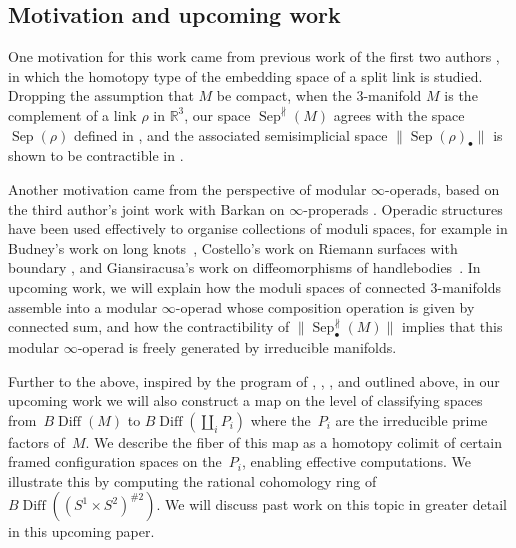 \documentclass{amsart}
\theoremstyle{plain}
\theoremstyle{definition}
\DeclareMathOperator\Diff{Diff}
\DeclareMathOperator\sep{Sep} %
\newcommand{\sepNP}{\sep^{\nparallel}} %
\newcommand{\BDiff}{B\!\Diff}
\newcommand{\bt}{\bullet}
\begin{document}
\subsection{Motivation and upcoming work}\label{subsection - upcoming work}

One motivation for this work came from previous work of the first two authors \cite{BoydBregman22}, in which the homotopy type of the embedding space of a split link is studied. Dropping the assumption that $M$ be compact, when the 3-manifold $M$ is the complement of a link $\rho$ in $\mathbb{R}^3$, our space $\sepNP(M)$ agrees with the space $\sep(\rho)$ defined in \cite{BoydBregman22}, and the associated semisimplicial space $\|\sep(\rho)_\bullet\|$ is shown to be contractible in \cite[Theorem A]{BoydBregman22}. 

Another motivation came from the perspective of modular $\infty$-operads, based on the third author's joint work with Barkan on $\infty$-properads \cite{equifibered-properads}.
Operadic structures have been used effectively to organise collections of moduli spaces, for example in Budney's work on long knots~\cite{Budney}, Costello's work on Riemann surfaces with boundary \cite{costello2004ainfinity}, and Giansiracusa's work on diffeomorphisms of handlebodies~\cite{Giansiracusa11}.
In upcoming work, we will explain how the moduli spaces of connected $3$-manifolds assemble into a modular $\infty$-operad whose composition operation is given by connected sum, 
and how the contractibility of $\|\sepNP_\bt(M)\|$ implies that this modular $\infty$-operad is freely generated by irreducible manifolds.

Further to the above, inspired by the program of \cite{CesardeSaRourke}, \cite{HendriksLaudenbach1984}, \cite{HendriksMcCullough}, and \cite{HatcherReducible} outlined above, in our upcoming work we will also construct a map on the level of classifying spaces
from~$\BDiff(M)$ to $\BDiff(\amalg_i P_i)$ where the~$P_i$ are the irreducible prime factors of~$M$. 
We describe
the fiber of this map as a homotopy colimit of certain framed configuration spaces on the~$P_i$, enabling effective computations. 
We illustrate this by computing the rational cohomology ring of~$\BDiff\left((S^1\times S^2)^{\# 2}\right)$. We will discuss past work on this topic in greater detail in this upcoming paper.
\end{document}
